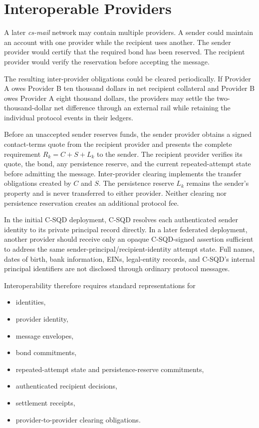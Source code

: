 \documentclass[11pt]{article}
\begin{document}
\section{Interoperable Providers}

A later \textit{cs-mail} network may contain multiple providers. A sender could maintain an account with one provider while the recipient uses another. The sender provider would certify that the required bond has been reserved. The recipient provider would verify the reservation before accepting the message.

The resulting inter-provider obligations could be cleared periodically. If Provider A owes Provider B ten thousand dollars in net recipient collateral and Provider B owes Provider A eight thousand dollars, the providers may settle the two-thousand-dollar net difference through an external rail while retaining the individual protocol events in their ledgers.

Before an unaccepted sender reserves funds, the sender provider obtains a signed contact-terms quote from the recipient provider and presents the complete requirement $R_k=C+S+L_k$ to the sender. The recipient provider verifies its quote, the bond, any persistence reserve, and the current repeated-attempt state before admitting the message. Inter-provider clearing implements the transfer obligations created by $C$ and $S$. The persistence reserve $L_k$ remains the sender's property and is never transferred to either provider. Neither clearing nor persistence reservation creates an additional protocol fee.

In the initial C-SQD deployment, C-SQD resolves each authenticated sender identity to its private principal record directly. In a later federated deployment, another provider should receive only an opaque C-SQD-signed assertion sufficient to address the same sender-principal/recipient-identity attempt state. Full names, dates of birth, bank information, EINs, legal-entity records, and C-SQD's internal principal identifiers are not disclosed through ordinary protocol messages.

Interoperability therefore requires standard representations for

\begin{itemize}[leftmargin=2em]
    \item identities,
    \item provider identity,
    \item message envelopes,
    \item bond commitments,
    \item repeated-attempt state and persistence-reserve commitments,
    \item authenticated recipient decisions,
    \item settlement receipts,
    \item provider-to-provider clearing obligations.
\end{itemize}
\end{document}
